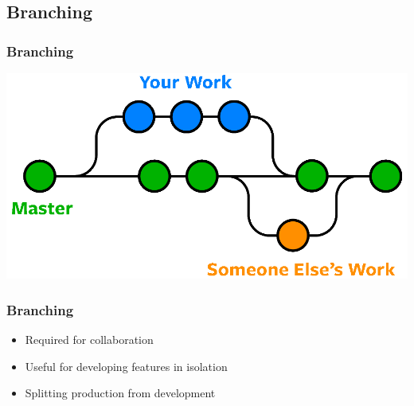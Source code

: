 \documentclass[presentation]{beamer}
\begin{document}
  \subsection{Branching}
  \begin{frame}
    \frametitle{Branching}
  
    \includegraphics[width=\textwidth]{git-branches-merge.png}
  \end{frame}
  \begin{frame}
    \frametitle{Branching}
  
    \begin{itemize}
      \item Required for collaboration
      \item Useful for developing features in isolation
      \item Splitting production from development
    \end{itemize}  
  \end{frame}
\end{document}
